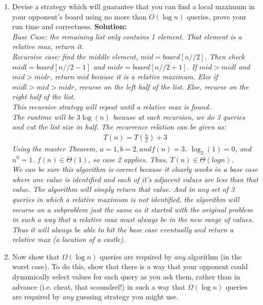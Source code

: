 \documentclass[10pt]{article}
\begin{document}
\begin{enumerate}
    \item Devise a strategy which will guarantee that you can find a local maximum in your opponent's board using no more than $O(\log n)$ queries, prove your run time and correctness.
    \textbf{Solution:} \\
    \emph{
    Base Case: the remaining list only contains 1 element. That element is a relative max, return it. \\
    Recursive case: find the middle element, $mid = board[n // 2]$. Then check $midl = board[n // 2 - 1]$ and $midr = board[n // 2 + 1]$. If $mid > midl$ and $mid > midr$, return mid because it is a relative maximum. Else if $midl > mid > midr$, recurse on the left half of the list. Else, recurse on the right half of the list. \\
    This recursive strategy will repeat until a relative max is found. \\
    The runtime will be $3\log(n)$ because at each recursion, we do 3 queries and cut the list size in half. The recurrence relation can be given as: \\
    \begin{align*}
        T(n) = T(\frac{n}{2}) + 3
    \end{align*}
    Using the master Theorem, $a = 1, b = 2, and f(n) = 3$. $\log_2(1) = 0$, and $n^0 = 1$. $f(n) \in \Theta(1)$, so case 2 applies.
    Thus, $T(n) \in \Theta(logn)$. \\
    We can be sure this algorithm is correct because it clearly works in a base case where one value is identified and each of it's adjacent values are less than that value. The algorithm will simply return that value. And in any set of 3 queries in which a relative maximum is not identified, the algorithm will recurse on a subproblem just the same as it started with the original problem in such a way that a relative max must always be in the new range of values. Thus it will always be able to hit the base case eventually and return a relative max (a location of a castle). } \\
    \item Now show that $\Omega(\log n)$ queries are required by \emph{any} algorithm (in the worst case). To do this, show that there is a way that your opponent could dynamically select values for each query as you ask them, rather than in advance (i.e. cheat, that scoundrel!) in such a way that $\Omega(\log n)$ queries are required by \emph{any} guessing strategy you might use. \\

\end{enumerate}
\end{document}
